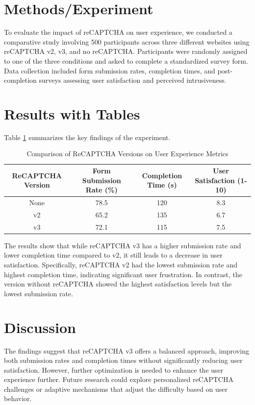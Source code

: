 \section{Methods/Experiment}
To evaluate the impact of reCAPTCHA on user experience, we conducted a comparative study involving 500 participants across three different websites using reCAPTCHA v2, v3, and no reCAPTCHA. Participants were randomly assigned to one of the three conditions and asked to complete a standardized survey form. Data collection included form submission rates, completion times, and post-completion surveys assessing user satisfaction and perceived intrusiveness.

\section{Results with Tables}
Table \ref{tab:results} summarizes the key findings of the experiment.

\begin{table}[ht]
\centering
\begin{tabular}{|c|c|c|c|}
\hline
ReCAPTCHA Version & Form Submission Rate (\%) & Completion Time (s) & User Satisfaction (1-10) \\
\hline
None & 78.5 & 120 & 8.3 \\
v2 & 65.2 & 135 & 6.7 \\
v3 & 72.1 & 115 & 7.5 \\
\hline
\end{tabular}
\caption{Comparison of ReCAPTCHA Versions on User Experience Metrics}
\label{tab:results}
\end{table}

The results show that while reCAPTCHA v3 has a higher submission rate and lower completion time compared to v2, it still leads to a decrease in user satisfaction. Specifically, reCAPTCHA v2 had the lowest submission rate and highest completion time, indicating significant user frustration. In contrast, the version without reCAPTCHA showed the highest satisfaction levels but the lowest submission rate.

\section{Discussion}
The findings suggest that reCAPTCHA v3 offers a balanced approach, improving both submission rates and completion times without significantly reducing user satisfaction. However, further optimization is needed to enhance the user experience further. Future research could explore personalized reCAPTCHA challenges or adaptive mechanisms that adjust the difficulty based on user behavior.

